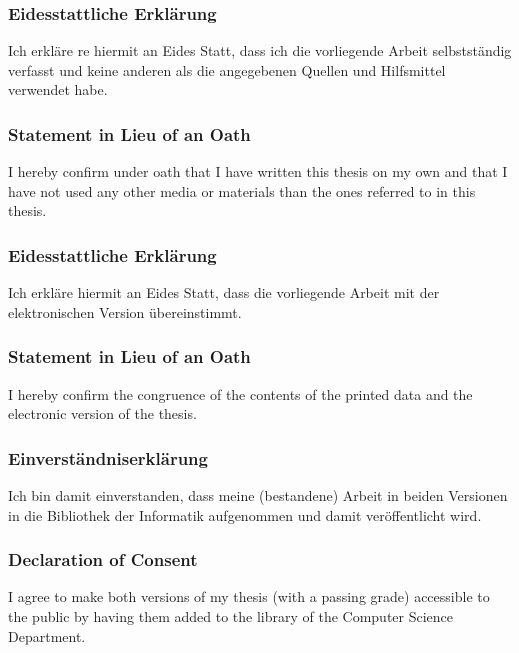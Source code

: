 \subsubsection*{Eidesstattliche Erkl{\"a}rung}
Ich erkl{\"a}re re  hiermit an Eides Statt, dass ich die vorliegende Arbeit selbstst{\"a}ndig verfasst und
keine anderen als die angegebenen Quellen und Hilfsmittel verwendet habe.
\subsubsection*{Statement in Lieu of an Oath}
I hereby confirm under oath that I have written this thesis on my own and that I have not
used any other media or materials than the ones referred to in this thesis.

\vspace{1cm}

\subsubsection*{Eidesstattliche Erkl{\"a}rung}
Ich erkl{\"a}re hiermit an Eides Statt, dass die vorliegende Arbeit mit der elektronischen Version {\"u}bereinstimmt.
\subsubsection*{Statement in Lieu of an Oath}
I hereby confirm the congruence of the contents of the printed data and the electronic version of the thesis.

\vspace{1cm}

\subsubsection*{Einverst{\"a}ndniserkl{\"a}rung}
Ich bin damit einverstanden, dass meine (bestandene) Arbeit in beiden Versionen in die
Bibliothek der Informatik aufgenommen und damit ver{\"o}ffentlicht wird.

\subsubsection*{Declaration of Consent}
I agree to make both versions of my thesis (with a passing grade) accessible to the public 
by having them added to the library of the Computer Science Department.
